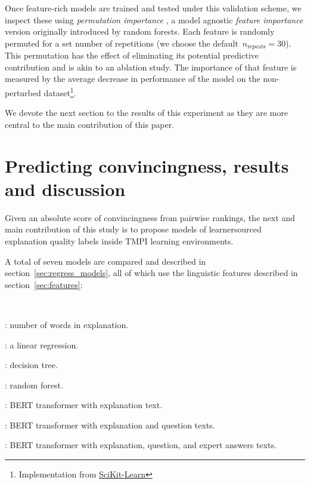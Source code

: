 \documentclass[notitlepage,12pt]{jedm}
\begin{document}
Once feature-rich models are trained and tested under this validation scheme, 
we inspect these using \textit{permutation importance} \cite{fisher_all_2019}, 
a model agnostic \textit{feature importance} version originally 
introduced by  random forests. 
Each feature is randomly permuted for a set number of repetitions (we choose 
the default~$n_{\mathrm{repeats}}=30$).  This permutation has the effect of
eliminating its potential predictive contribution and is akin to an ablation study. The importance of that feature is measured 
by the average decrease in performance of the model on the non-perturbed 
dataset\footnote{Implementation from 
  \href{https://scikit-learn.org/stable/modules/permutation_importance.html}{SciKit-Learn}}.

We devote the next section to the results of this experiment as they are more central to the main contribution of this paper.

\section{Predicting convincingness, results and discussion}\label{sec:model_results}

Given an absolute score of convincingness from pairwise rankings, the next and main contribution of this study is to propose models of learnersourced explanation quality labels inside TMPI learning 
environments. 

A total of seven models are compared and described in section~\ref{sec:regress_models}, all of which use the linguistic features described in section~\ref{sec:features}:

\parbox{3ex}{~}
\parbox{0.75\textwidth}{
\begin{description}[noitemsep]
\item [\textbf{Length}]: number of words in explanation.
\item [\textbf{Linear}]: a linear regression.
\item [\textbf{DTree}]: decision tree.
\item [\textbf{RF}]: random forest.
\item [\textbf{BERT}]: BERT transformer with explanation text.
\item [\textbf{BERT\_Q}]: BERT transformer with explanation and question texts.
\item [\textbf{BERT\_A}]: BERT transformer with explanation, question, and expert answers texts.
\end{description}}
\end{document}
